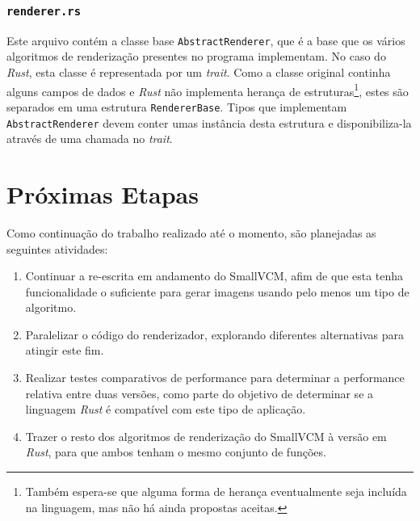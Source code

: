 \documentclass[tg]{mdtufsm}
\begin{document}
\subsection{\texttt{renderer.rs}}

Este arquivo contém a classe base \texttt{AbstractRenderer}, que é a base que os vários algoritmos de renderização presentes no programa implementam. No caso do \emph{Rust}, esta classe é representada por um \emph{trait}. Como a classe original continha alguns campos de dados e \emph{Rust} não implementa herança de estruturas\footnote{Também espera-se que alguma forma de herança eventualmente seja incluída na linguagem, mas não há ainda propostas aceitas.}, estes são separados em uma estrutura \texttt{RendererBase}. Tipos que implementam \texttt{AbstractRenderer} devem conter umas instância desta estrutura e disponibiliza-la através de uma chamada no \emph{trait}.

\chapter{Próximas Etapas}

Como continuação do trabalho realizado até o momento, são planejadas as seguintes atividades:

\begin{enumerate}
	\item Continuar a re-escrita em andamento do SmallVCM, afim de que esta tenha funcionalidade o suficiente para gerar imagens usando pelo menos um tipo de algoritmo.
	\item Paralelizar o código do renderizador, explorando diferentes alternativas para atingir este fim.
	\item Realizar testes comparativos de performance para determinar a performance relativa entre duas versões, como parte do objetivo de determinar se a linguagem \emph{Rust} é compatível com este tipo de aplicação.
	\item Trazer o resto dos algoritmos de renderização do SmallVCM à versão em \emph{Rust}, para que ambos tenham o mesmo conjunto de funções.
\end{enumerate}

\setlength{\baselineskip}{\baselineskip}


\end{document}
